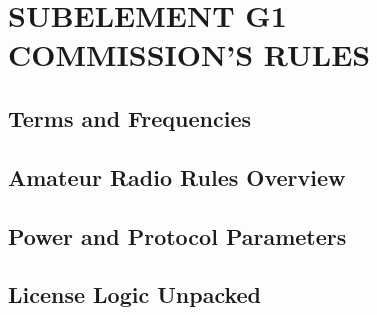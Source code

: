 \documentclass[12pt]{book}
\begin{document}
\tableofcontents
\newpage
\chapter{SUBELEMENT G1  COMMISSION'S RULES}
\section{Terms and Frequencies}











\section{Amateur Radio Rules Overview}











\section{Power and Protocol Parameters}











\section{License Logic Unpacked}












\end{document}
